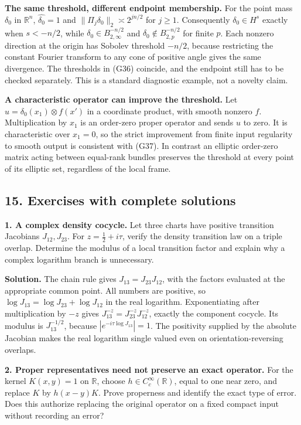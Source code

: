 \documentclass[
  11pt,
]{article}
\begin{document}
\textbf{The same threshold, different endpoint membership.} For the
point mass \(\delta_0\) in \(\mathbb R^n\), \(\widehat{\delta_0}=1\) and
\(\|\Pi_j\delta_0\|_2\asymp2^{jn/2}\) for \(j\geq1\). Consequently
\(\delta_0\in H^s\) exactly when \(s<-n/2\), while
\(\delta_0\in B^{-n/2}_{2,\infty}\) and
\(\delta_0\notin B^{-n/2}_{2,p}\) for finite \(p\). Each nonzero
direction at the origin has Sobolev threshold \(-n/2\), because
restricting the constant Fourier transform to any cone of positive angle
gives the same divergence. The thresholds in (G36) coincide, and the
endpoint still has to be checked separately. This is a standard
diagnostic example, not a novelty claim.

\textbf{A characteristic operator can improve the threshold.} Let
\(u=\delta_0(x_1)\otimes f(x')\) in a coordinate product, with smooth
nonzero \(f\). Multiplication by \(x_1\) is an order-zero proper
operator and sends \(u\) to zero. It is characteristic over \(x_1=0\),
so the strict improvement from finite input regularity to smooth output
is consistent with (G37). In contrast an elliptic order-zero matrix
acting between equal-rank bundles preserves the threshold at every point
of its elliptic set, regardless of the local frame.

\subsection{15. Exercises with complete
solutions}\label{exercises-with-complete-solutions}

\textbf{1. A complex density cocycle.} Let three charts have positive
transition Jacobians \(J_{12},J_{23}\). For \(z=\frac12+i\tau\), verify
the density transition law on a triple overlap. Determine the modulus of
a local transition factor and explain why a complex logarithm branch is
unnecessary.

\textbf{Solution.} The chain rule gives \(J_{13}=J_{23}J_{12}\), with
the factors evaluated at the appropriate common point. All numbers are
positive, so \(\log J_{13}=\log J_{23}+\log J_{12}\) in the real
logarithm. Exponentiating after multiplication by \(-z\) gives
\(J_{13}^{-z}=J_{23}^{-z}J_{12}^{-z}\), exactly the component cocycle.
Its modulus is \(J_{13}^{-1/2}\), because \(|e^{-i\tau\log J_{13}}|=1\).
The positivity supplied by the absolute Jacobian makes the real
logarithm single valued even on orientation-reversing overlaps.

\textbf{2. Proper representatives need not preserve an exact operator.}
For the kernel \(K(x,y)=1\) on \(\mathbb R\), choose
\(h\in C_c^\infty(\mathbb R)\), equal to one near zero, and replace
\(K\) by \(h(x-y)K\). Prove properness and identify the exact type of
error. Does this authorize replacing the original operator on a fixed
compact input without recording an error?
\end{document}
